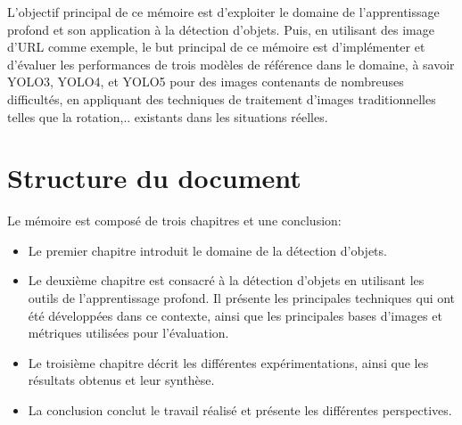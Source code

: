 L'objectif principal de ce mémoire est d'exploiter le domaine de l'apprentissage profond et son application à la détection d'objets. Puis, en utilisant des image d'URL comme exemple, le but principal de ce mémoire est d'implémenter et d'évaluer les performances de trois  modèles de référence dans le domaine, à savoir  YOLO3, YOLO4, et YOLO5 pour des images contenants de nombreuses difficultés, en appliquant des techniques de traitement d'images traditionnelles telles que la rotation,..  existants dans les situations réelles.

\section*{Structure du document}
Le mémoire est composé de trois chapitres et une conclusion:

\begin{itemize}
\item Le premier chapitre introduit le domaine de la détection d'objets.
\item Le deuxième chapitre est consacré à la détection d'objets en utilisant les outils de l'apprentissage profond. Il présente les principales techniques qui ont été développées dans ce contexte, ainsi que les principales bases d'images et métriques utilisées pour l'évaluation.
\item Le troisième chapitre décrit les différentes expérimentations, ainsi que les résultats obtenus et leur synthèse.
\item La conclusion conclut le travail réalisé et présente les différentes perspectives.
\end{itemize}